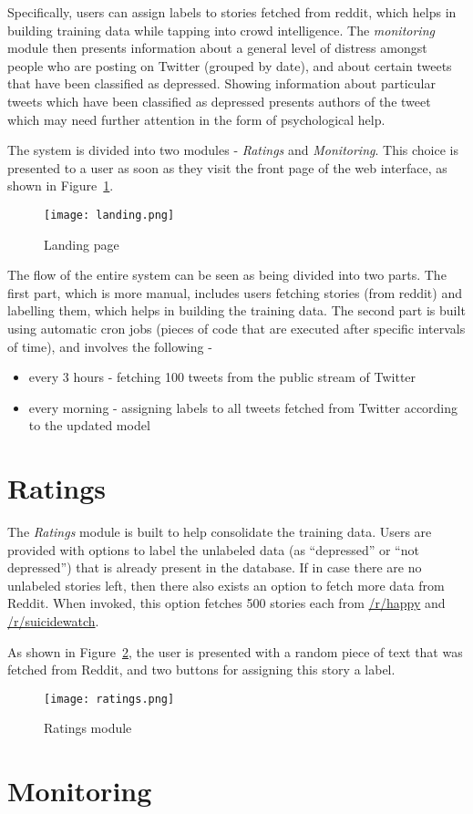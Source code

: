 Specifically, users can assign labels to stories fetched from reddit, which helps in building training data while tapping into crowd intelligence. The \emph{monitoring} module then presents information about a general level of distress amongst people who are posting on Twitter (grouped by date), and about certain tweets that have been classified as depressed. Showing information about particular tweets which have been classified as depressed presents authors of the tweet which may need further attention in the form of psychological help.

The system is divided into two modules - \emph{Ratings} and \emph{Monitoring}. This choice is presented to a user as soon as they visit the front page of the web interface, as shown in Figure~\ref{landing}.
\begin{figure}
    \centering
    \texttt{[image: landing.png]}
    \caption{Landing page}
    \label{landing}
\end{figure}

The flow of the entire system can be seen as being divided into two parts. The first part, which is more manual, includes users fetching stories (from reddit) and labelling them, which helps in building the training data. The second part is built using automatic cron jobs (pieces of code that are executed after specific intervals of time), and involves the following -
\begin{itemize}
    \item{every 3 hours - fetching 100 tweets from the public stream of Twitter}
    \item{every morning - assigning labels to all tweets fetched from Twitter according to the updated model}
\end{itemize}

\section{Ratings}
The \emph{Ratings} module is built to help consolidate the training data. Users are provided with options to label the unlabeled data (as ``depressed'' or ``not depressed'') that is already present in the database. If in case there are no unlabeled stories left, then there also exists an option to fetch more data from Reddit. When invoked, this option fetches 500 stories each from \href{http://www.reddit.com/r/happy}{/r/happy} and \href{http://www.reddit.com/r/suicidewatch}{/r/suicidewatch}.

As shown in Figure~\ref{ratings}, the user is presented with a random piece of text that was fetched from Reddit, and two buttons for assigning this story a label.

\begin{figure}
    \centering
    \texttt{[image: ratings.png]}
    \caption{Ratings module}
    \label{ratings}
\end{figure}

\section{Monitoring}
